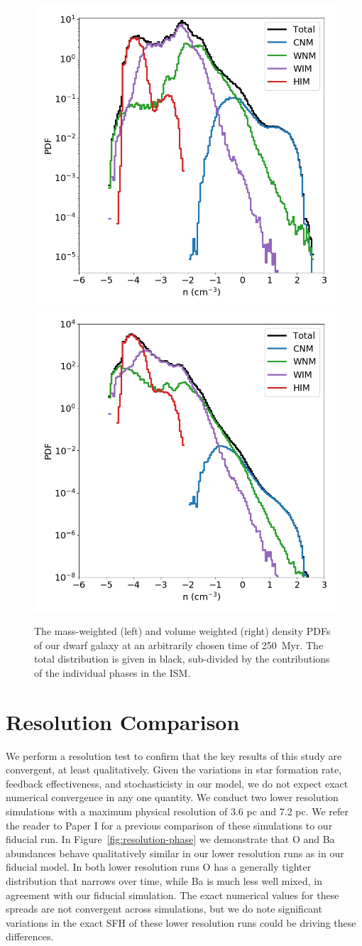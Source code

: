 \documentclass[twocolumn]{aastex61}
\begin{document}
\begin{figure}
\centering
\includegraphics[width=0.475\linewidth]{density_PDF.png}
\includegraphics[width=0.475\linewidth]{density_PDF_volume_weighted.png}\caption{The mass-weighted (left) and volume weighted (right) density PDFs of our dwarf galaxy at an arbitrarily chosen time of 250~Myr. The total distribution is given in black, sub-divided by the contributions of the individual phases in the ISM.}
\label{fig:density_pdf}
\end{figure}

\section{Resolution Comparison}
We perform a resolution test to confirm that the key results of this study are convergent, at least qualitatively. Given the variations in star formation rate, feedback effectiveness, and stochasticisty in our model, we do not expect exact numerical convergence in any one quantity. We conduct two lower resolution simulations with a maximum physical resolution of 3.6 pc and 7.2 pc. We refer the reader to Paper I for a previous comparison of these simulations to our fiducial run. In Figure~\ref{fig:resolution-phase} we demonstrate that O and Ba abundances behave qualitatively similar in our lower resolution runs as in our fiducial model. In both lower resolution runs O has a generally tighter distribution that narrows over time, while Ba is much less well mixed, in agreement with our fiducial simulation. The exact numerical values for these spreads are not convergent across simulations, but we do note significant variations in the exact SFH of these lower resolution runs could be driving these differences.
\end{document}
